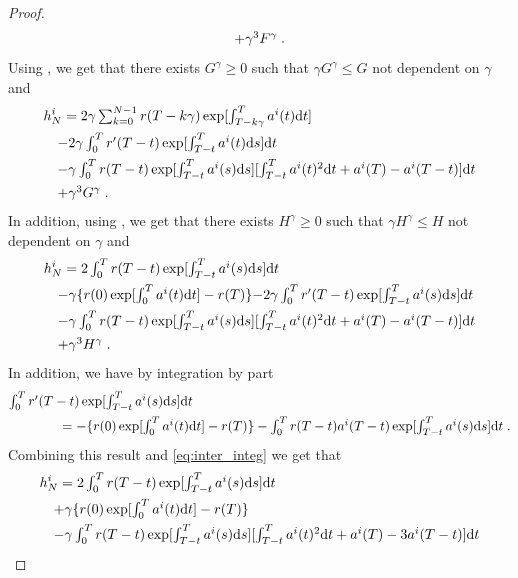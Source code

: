 \begin{proof}
\begin{align}
  & \quad \textstyle{  + \gamma^3  F^\gamma \;. }     
\end{align}
Using , we get that there exists $G^\gamma \geq 0$ such that
$\gamma G^\gamma \leq G$ not dependent on $\gamma$ and
\begin{align}
  &h_N^i = \textstyle{2 \gamma \sum_{k=0}^{N-1}  r(T - k \gamma) \exp[\int_{T - k \gamma}^{T} a^i(t) \mathrm{d}t ]} \\
  & \quad \textstyle{-2\gamma \int_0^T r'(T-t) \exp[\int_{T - t}^{T} a^i(t) \mathrm{d}s ] \mathrm{d}t } \\
  & \quad  \textstyle{- \gamma \int_0^T r(T - t) \exp[\int_{T - t}^{T} a^i(s) \mathrm{d}s ][\int_{T - t}^{T} a^i(t)^2 \mathrm{d}t + a^i(T) - a^i(T - t)] \mathrm{d}t } \\
  & \quad \textstyle{  + \gamma^3  G^\gamma \;. }     
\end{align}
In addition, using , we get that there exists
$H^\gamma \geq 0$ such that $\gamma H^\gamma \leq H$ not dependent on $\gamma$
and
\begin{align}
  &h_N^i = \textstyle{2 \int_0^T  r(T - t) \exp[\int_{T - t}^{T} a^i(s) \mathrm{d}s ] \mathrm{d}t} \\
  &\quad \textstyle{- \gamma \{r(0) \exp[\int_{0}^{T} a^i(t) \mathrm{d}t ]- r(T)\}}  \textstyle{-2\gamma \int_0^T r'(T-t) \exp[\int_{T - t}^{T} a^i(s) \mathrm{d}s ] \mathrm{d}t } \\
  & \quad  \textstyle{- \gamma \int_0^T r(T - t) \exp[\int_{T - t}^{T} a^i(s) \mathrm{d}s ][\int_{T - t}^{T} a^i(t)^2 \mathrm{d}t + a^i(T) - a^i(T - t)] \mathrm{d}t } \\
  & \quad \textstyle{  + \gamma^3  H^\gamma \;. } \label{eq:inter_integ}    
\end{align}
In addition, we have by integration by part
\begin{align}
  &\textstyle{\int_0^T r'(T-t) \exp[\int_{T - t}^{T} a^i(s) \mathrm{d}s ] \mathrm{d}t} \\
  & \qquad \qquad \textstyle{= - \{r(0) \exp[\int_0^T a^i(t) \mathrm{d}t] - r(T)\} - \int_0^T r(T-t) a^i(T-t) \exp[\int_{T - t}^{T} a^i(s) \mathrm{d}s ] \mathrm{d}t \;.  }
\end{align}
Combining this result and \eqref{eq:inter_integ} we get that
\begin{align}
  &h_N^i = \textstyle{2 \int_0^T  r(T - t) \exp[\int_{T - t}^{T} a^i(s) \rmd s ] \rmd t} \\
  &\quad \textstyle{+ \gamma \{r(0) \exp[\int_{0}^{T} a^i(t) \rmd t ]- r(T)\}}  \\
  & \quad  \textstyle{- \gamma \int_0^T r(T - t) \exp[\int_{T - t}^{T} a^i(s) \rmd s ][\int_{T - t}^{T} a^i(t)^2 \rmd t + a^i(T) - 3 a^i(T - t)] \rmd t } \\

\end{align}
\end{proof}
